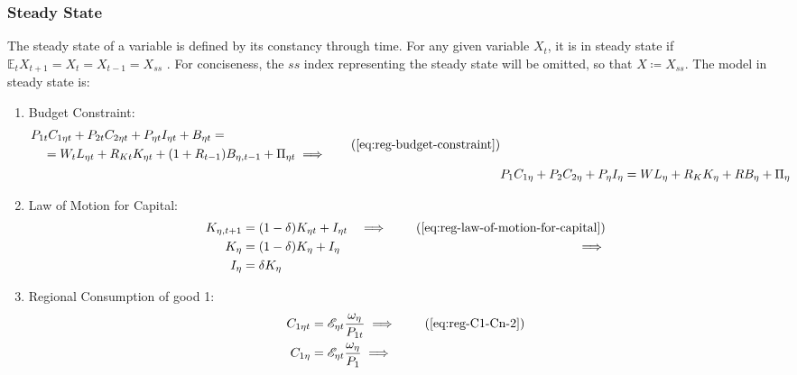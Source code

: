 \documentclass[
thesis.tex
]{subfiles}
\begin{document}


\subsubsection{Steady State}

The steady state of a variable is defined by its constancy through time. For any given variable $X_t$, it is in steady state if $\mathbb{E}_t X_{t+1} = X_t = X_{t-1} = X_{ss}$ \cite[p.41]{costa_junior_understanding_2016}. For conciseness, the $ss$ index representing the steady state will be omitted, so that $X \coloneq X_{ss}$. The model in steady state is:

\begin{enumerate}

	\item Budget Constraint: 
	\begin{align}
	\begin{split}
		& P_{1t} C_{1\eta t} + P_{2t} C_{2\eta t} + P_{\eta t} I_{\eta t} + B_{\eta t} = \\ & \quad = W_t L_{\eta t} + R_{Kt} K_{\eta t} + (1 + R_{t-1}) B_{\eta,t-1} + \Pi_{\eta t} \implies
	\end{split} \tag{\ref{eq:reg-budget-constraint}}
	\\
	& P_{1} C_{1\eta} + P_{2} C_{2\eta} + P_{\eta} I_{\eta} = W L_{\eta} + R_{K} K_{\eta} + R B_{\eta} + \Pi_{\eta} \label{eq:reg-ss-budget-constraint}
	\end{align}

	\item Law of Motion for Capital:
	\begin{alignat}{2}
		K_{\eta, t+1} &= (1-\delta)K_{\eta t} + I_{\eta t} &\implies \tag{\ref{eq:reg-law-of-motion-for-capital}} \\
		K_{\eta} &= (1-\delta)K_{\eta} + I_{\eta} &\implies \nonumber \\
		I_{\eta} &= \delta K_{\eta} \label{eq:reg-ss-law-of-motion-for-capital}
	\end{alignat}

	\item Regional Consumption of good 1:
	\begin{align}
		C_{1\eta t} &= \te \frac{\omega_{\eta}}{P_{1t}} \implies \tag{\ref{eq:reg-C1-Cn-2}} \\
		C_{1\eta} &= \te \frac{\omega_{\eta}}{P_{1}} \implies \label{eq:reg-ss-C1-Cn-2}
	\end{align}


\end{enumerate}
\end{document}
